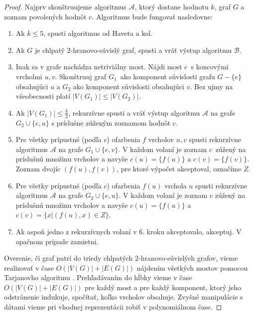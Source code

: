 \begin{proof}
    Najprv skonštruujeme algoritmus $\mathcal{A}$, ktorý dostane hodnotu $k$, graf $G$ a zoznam
    povolených hodnôt $c$. Algoritmus bude fungovať nasledovne:

    \begin{enumerate}
        \item Ak $k \leq 5$, spusti algoritmus od Haveta a kol.
        \item Ak $G$ je chlpatý $2$-hranovo-súvislý graf, spusti a vráť výstup algoritmu $\mathcal{B}$.
        \item Inak sa v grafe nachádza netriviálny most. Nájdi most $e$ s koncovými vrcholmi $u, v$.
        Skonštruuj graf $G_1$ ako komponent súvislosti grafu $G - \{e\}$ obsahujúci $u$ a $G_2$ ako
        komponent súvislosti obsahujúci $v$. Bez ujmy na všeobecnosti platí $|V(G_1)| \leq |V(G_2)|$.
        \item Ak $\left |V(G_1) \right| \leq \frac{k}{2}$, rekurzívne spusti a vráť výstup algoritmu
        $\mathcal{A}$ na grafe $G_2 \cup \{e, u\}$ s príslušne zúženým zoznamom hodnôt $c$.
        \item Pre všetky prípustné (podľa $c$) ofarbenia $f$ vrcholov $u, v$ spusti rekurzívne
        algoritmus $\mathcal{A}$ na grafe $G_1 \cup \{e, v\}$. V každom volaní je zoznam $c$ zúžený
        na príslušnú množinu vrcholov a navyše $c(u) = \{f(u)\}$ a $c(v) = \{f(v)\}$. Zoznam dvojíc
        $(f(u), f(v))$, pre ktoré výpočet akceptoval, označíme $Z$.
        \item Pre všetky prípustné (podľa $c$) ofarbenia $f(u)$ vrchola $u$ spusti rekurzívne
        algoritmus $\mathcal{A}$ na grafe $G_2 \cup \{e, u\}$. V každom volaní je zoznam $c$ zúžený
        na príslušnú množinu vrcholov a navyše $c(u) = \{f(u)\}$ a $c(v) = \{x | (f(u), x) \in Z\}$.
        \item Ak aspoň jedno z rekurzívnych volaní v 6. kroku akceptovalo, akceptuj. V opačnom prípade
        zamietni.
    \end{enumerate}

    Overenie, či graf patrí do triedy chlpatých $2$-hranovo-súvislých grafov, vieme realizovať v čase
    $O(|V(G)| + |E(G)|)$ nájdením všetkých mostov pomocou Tarjanovho
    algoritmu \cite{tarjan_bridge}. Prehľadávaním do hĺbky vieme v čase $O(|V(G)| + |E(G)|)$ pre
    každý most a pre každý komponent, ktorý jeho odstránenie indukuje, spočítať, koľko vrcholov obsahuje.
    Zvyšné manipulácie s dátami vieme pri vhodnej reprezentácii robiť v polynomiálnom čase.


\end{proof}
